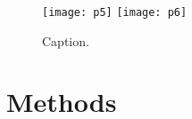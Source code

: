 \documentclass{article}
\begin{document}
\begin{markdown}
\begin{figure}[ht] \hspace*{0cm} 
\begin{center}
    \texttt{[image: p5]}
    \texttt{[image: p6]}
	\caption{Caption.}
	\label{fig:p5p6}
\end{center}
\end{figure}


\section{Methods}

\end{markdown}


\end{document}
